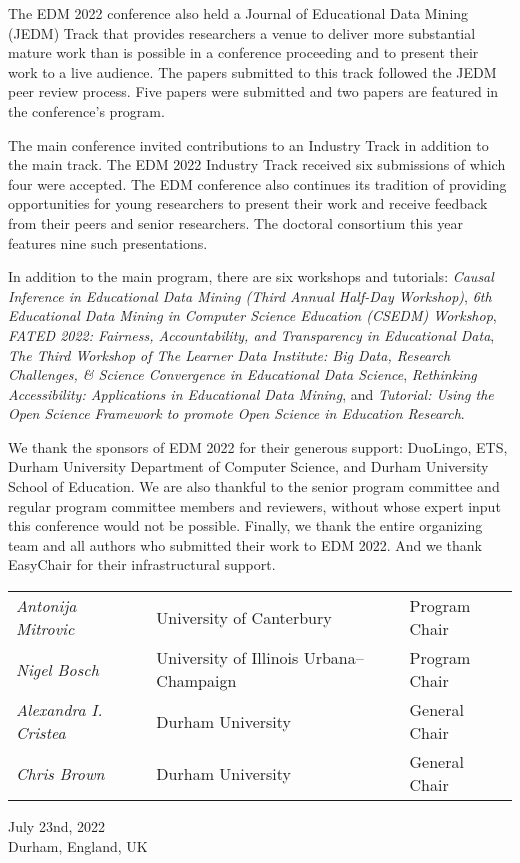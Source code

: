 \documentclass[letterpaper,11pt,oneside]{book} %
\begin{document}
The EDM 2022 conference also held a Journal of Educational Data Mining
(JEDM) Track that provides researchers a venue to deliver more
substantial mature work than is possible in a conference proceeding and
to present their work to a live audience. The papers submitted to this
track followed the JEDM peer review process. Five papers were submitted
and two papers are featured in the conference's program.

The main conference invited contributions to an Industry Track in
addition to the main track. The EDM 2022 Industry Track received six
submissions of which four were accepted. The EDM conference also
continues its tradition of providing opportunities for young researchers
to present their work and receive feedback from their peers and senior
researchers. The doctoral consortium this year features nine such
presentations.

In addition to the main program, there are six workshops and tutorials:
\emph{Causal Inference in Educational Data Mining (Third Annual Half-Day
Workshop)}, \emph{6th Educational Data Mining in Computer Science
Education (CSEDM) Workshop}, \emph{FATED 2022: Fairness, Accountability,
and Transparency in Educational Data}, \emph{The Third Workshop of The
Learner Data Institute: Big Data, Research Challenges, \& Science
Convergence in Educational Data Science}, \emph{Rethinking
Accessibility: Applications in Educational Data Mining}, and
\emph{Tutorial: Using the Open Science Framework to promote Open Science
in Education Research}.

We thank the sponsors of EDM 2022 for their generous support: DuoLingo,
ETS, Durham University Department of Computer Science, and Durham
University School of Education. We are also thankful to the senior
program committee and regular program committee members and reviewers,
without whose expert input this conference would not be possible.
Finally, we thank the entire organizing team and all authors who
submitted their work to EDM 2022. And we thank EasyChair for their
infrastructural support.

\begin{longtable}[]{@{}lll@{}}
& & \\
\endhead
\emph{Antonija Mitrovic} & University of Canterbury & Program Chair \\
\emph{Nigel Bosch} & University of Illinois Urbana--Champaign & Program
Chair \\
\emph{Alexandra I. Cristea} & Durham University & General Chair \\
\emph{Chris Brown} & Durham University & General Chair \\
\end{longtable}
\vspace{.5cm}
\hfill
\begin{minipage}[t]{0.3\textwidth}
July 23nd, 2022\\
Durham, England, UK
\end{minipage}
\end{document}
